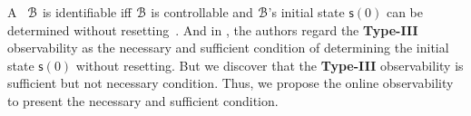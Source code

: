

A \BCN\ ${\mathcal{B}}$ is identifiable iff ${\mathcal{B}}$ is controllable and ${\mathcal{B}}$'s initial state $\mathsf{s}(0)$ can be determined  without  resetting~\cite{Cheng2011Identification}. And in \cite{Cheng2011Identification}, the authors regard the {\bf Type-III} observability as the necessary and sufficient condition of determining the initial state $\mathsf{s}(0)$  without  resetting. But we discover that the  {\bf Type-III} observability is sufficient but not necessary condition. Thus, we propose the online observability to present the necessary and sufficient condition.


   

